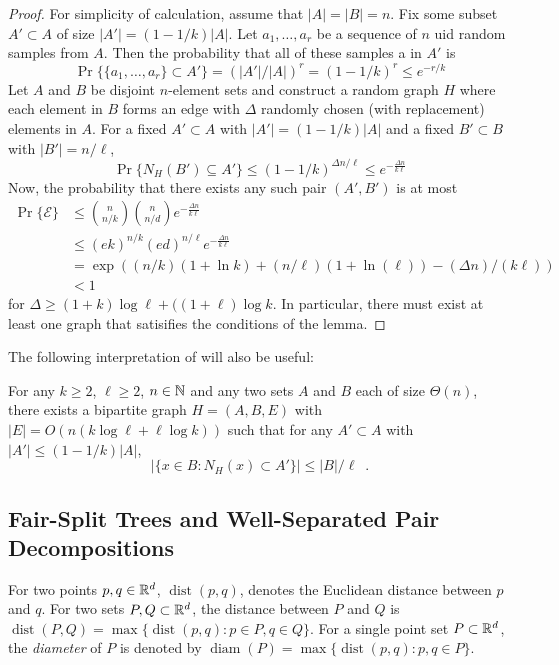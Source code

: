 \documentclass{patmorin}
\DeclareMathOperator{\diam}{diam}
\DeclareMathOperator{\dist}{dist}
\begin{document}
\begin{proof}
For simplicity of calculation, assume that $|A|=|B|=n$.
Fix some subset $A'\subset A$ of size $|A'|=(1-1/k)|A|$.  Let $a_1,\ldots,a_r$ be a sequence of $n$ uid random samples from $A$.
Then the probability that all of these samples a in $A'$ is 
\[
   \Pr\{\{a_1,\ldots,a_r\}\subset A'\} = (|A'|/|A|)^r = (1-1/k)^r \le e^{-r/k}
\]
Let $A$ and $B$ be disjoint $n$-element sets and construct a random graph $H$ where each element in $B$ forms an edge with $\Delta$ randomly chosen (with replacement) elements in $A$.  For a fixed $A'\subset A$ with $|A'|=(1-1/k)|A|$ and a fixed $B'\subset B$ with $|B'| = n/\ell$,
\[
    \Pr\{N_H(B') \subseteq A'\} \le (1-1/k)^{\Delta n/\ell} \le e^{-\frac{\Delta n}{k\ell}}
\]
Now, the probability that there exists any such pair $(A',B')$ is at most
\begin{align*}
    \Pr\{\mathcal{E}\} 
        & \le \binom{n}{n/k}\binom{n}{n/d}e^{-\frac{\Delta n}{k\ell}} \\
        & \le (ek)^{n/k} (ed)^{n/\ell}e^{-\frac{\Delta n}{k\ell}} \\
        & = \exp((n/k)(1+\ln k) + (n/\ell)(1+\ln(\ell)) - (\Delta n)/(k\ell)) \\
        & < 1
\end{align*}
for $\Delta \ge (1+k)\log \ell + ((1+\ell)\log k$.  In particular, there must exist at least one graph that satisifies the conditions of the lemma.
\end{proof}

The following interpretation of  will also be useful:

\begin{cor}
   For any $k\ge 2$, $\ell\ge 2$, $n\in\mathbb{N}$ and any two sets $A$ and $B$
   each of size $\Theta(n)$, there exists a bipartite graph $H=(A,B,E)$
   with $|E|=O(n(k\log \ell + \ell\log k))$ such that
   for any $A'\subset A$ with $|A'|\le (1-1/k)|A|$, 
   \[ |\{x\in B : N_H(x)\subset A' \}| \le |B|/\ell \enspace .\]
\end{cor}




\subsection{Fair-Split Trees and Well-Separated Pair Decompositions}

For two points $p,q\in\mathbb{R}^d$, $\dist(p,q)$, denotes the Euclidean distance
between $p$ and $q$. For two sets $P,Q\subset\mathbb{R}^d$, the distance between
$P$ and $Q$ is $\dist(P,Q)=\max\{\dist(p,q):p\in P, q\in Q\}$.  For a
single point set $P\subset\mathbb{R}^d$, the \emph{diameter} of $P$ is denoted
by $\diam(P)=\max\{\dist(p,q):p,q\in P\}$.
\end{document}
